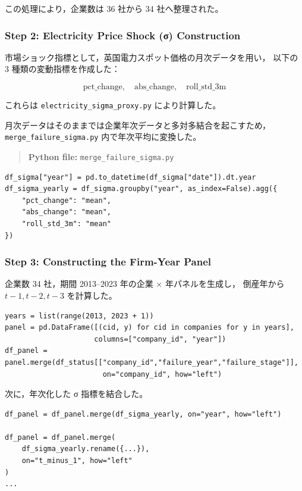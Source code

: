 この処理により，企業数は 36 社から 34 社へ整理された。

\subsubsection*{Step 2: Electricity Price Shock (σ) Construction}

市場ショック指標として，英国電力スポット価格の月次データを用い，
以下の 3 種類の変動指標を作成した：



\[
\text{pct\_change},\quad
\text{abs\_change},\quad
\text{roll\_std\_3m}
\]



これらは \texttt{electricity\_sigma\_proxy.py} により計算した。

月次データはそのままでは企業年次データと多対多結合を起こすため，
\texttt{merge\_failure\_sigma.py} 内で年次平均に変換した。

\begin{quote}
\textbf{Python file:} \texttt{merge\_failure\_sigma.py}
\end{quote}

\begin{verbatim}
df_sigma["year"] = pd.to_datetime(df_sigma["date"]).dt.year
df_sigma_yearly = df_sigma.groupby("year", as_index=False).agg({
    "pct_change": "mean",
    "abs_change": "mean",
    "roll_std_3m": "mean"
})
\end{verbatim}

\subsubsection*{Step 3: Constructing the Firm-Year Panel}

企業数 34 社，期間 2013--2023 年の企業 $\times$ 年パネルを生成し，
倒産年から $t-1, t-2, t-3$ を計算した。

\begin{verbatim}
years = list(range(2013, 2023 + 1))
panel = pd.DataFrame([(cid, y) for cid in companies for y in years],
                     columns=["company_id", "year"])
df_panel = panel.merge(df_status[["company_id","failure_year","failure_stage"]],
                       on="company_id", how="left")
\end{verbatim}

次に，年次化した σ 指標を結合した。

\begin{verbatim}
df_panel = df_panel.merge(df_sigma_yearly, on="year", how="left")

df_panel = df_panel.merge(
    df_sigma_yearly.rename({...}),
    on="t_minus_1", how="left"
)
...
\end{verbatim}

